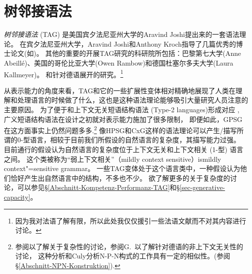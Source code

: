 
\chapter{树邻接语法}
\label{Kapitel-TAG}

\newcommand{\dotted}[0]{\makedash{2pt}}
\newcommand{\g}[1]{{\footnotesize $#1$}}


\emph{树邻接语法} (TAG)
是美国宾夕法尼亚州大学的Aravind Joshi提出来的一套语法理论\citep*{JLT75a-u}。
在宾夕法尼亚州大学，Aravind Joshi和Anthony Kroch指导了几篇优秀的博士论文(如\citealp{Rambow94a})。
其他的重要的开展TAG研究的科研院所包括：巴黎第七大学(Anne Abeill\'{e})、美国的哥伦比亚大学(Owen Rambow)和德国杜塞尔多夫大学(Laura Kallmeyer)。
和针对德语展开的研究。\footnote{
  因为我对法语了解有限，所以此处我仅仅援引一些法语文献而不对其内容进行讨论。
}

从表示能力的角度来看，TAG和它的一些扩展性变体相对精确地展现了人类在理解和处理语言的时候做了什么，这也是这种语法理论能够吸引大量研究人员注意的主要原因。
为了便于和上下文无关短语结构语法 (Type-2 languages)形成对应 ,
广义短语结构语法\indexgpsg 在设计之初就对表示能力施加了很多限制，
即便如此，GPSG在这方面事实上仍然问题多多\citep{Shieber85a,Culy85a}.\footnote{%
  参阅\citet{Pullum86a}以了解关于复杂性的讨论，参阅G.\ 以了解针对德语的非上下文无关性的讨论，
  这种分析和Culy分析N-P-N构式的工作具有一定的相似性。(参阅\S \ref{Abschnitt-NPN-Konstruktion}).%
	} 
像HPSG\indexhpsg 和CxG\indexcxg 这样的语法理论可以产生/描写所谓的0-型语言，相较于目前我们所假设的自然语言的复杂度，其描写能力过强。
目前通行的假设认为自然语言的复杂度位于上下文无关和上下文相关 (1-型) 语言之间。
这个类被称为``弱上下文相关''（{mildly context sensitive}）is{mildly context"=sensitive grammar}。
一些TAG变体处于这个语言类中，一种假设认为他们恰好产生出自然语言中的结构，不多也不少。
欲了解更多的关于复杂度的讨论，可以参见\S \ref{Abschnitt-Kompetenz-Performanz-TAG}和\S \ref{sec-generative-capacity}。

